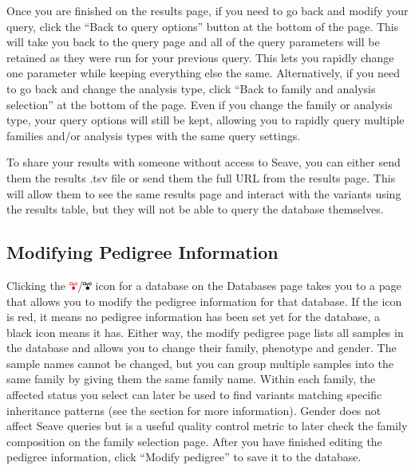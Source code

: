 \documentclass[11pt, a4paper]{article}
\begin{document}
Once you are finished on the results page, if you need to go back and modify your query, click the ``Back to query options'' button at the bottom of the page. This will take you back to the query page and all of the query parameters will be retained as they were run for your previous query. This lets you rapidly change one parameter while keeping everything else the same. Alternatively, if you need to go back and change the analysis type, click ``Back to family and analysis selection'' at the bottom of the page. Even if you change the family or analysis type, your query options will still be kept, allowing you to rapidly query multiple families and/or analysis types with the same query settings.

To share your results with someone without access to Seave, you can either send them the results .tsv file or send them the full URL from the results page. This will allow them to see the same results page and interact with the variants using the results table, but they will not be able to query the database themselves.

\subsection{Modifying Pedigree Information}\label{modifyPedigree}

Clicking the \includegraphics[width=8pt]{pedigree_icon_red.png}/\includegraphics[width=8pt]{pedigree_icon.png} icon for a database on the Databases page takes you to a page that allows you to modify the pedigree information for that database. If the icon is red, it means no pedigree information has been set yet for the database, a black icon means it has. Either way, the modify pedigree page lists all samples in the database and allows you to change their family, phenotype and gender. The sample names cannot be changed, but you can group multiple samples into the same family by giving them the same family name. Within each family, the affected status you select can later be used to find variants matching specific inheritance patterns (see the  section for more information). Gender does not affect Seave queries but is a useful quality control metric to later check the family composition on the family selection page. After you have finished editing the pedigree information, click ``Modify pedigree'' to save it to the database.
\end{document}
